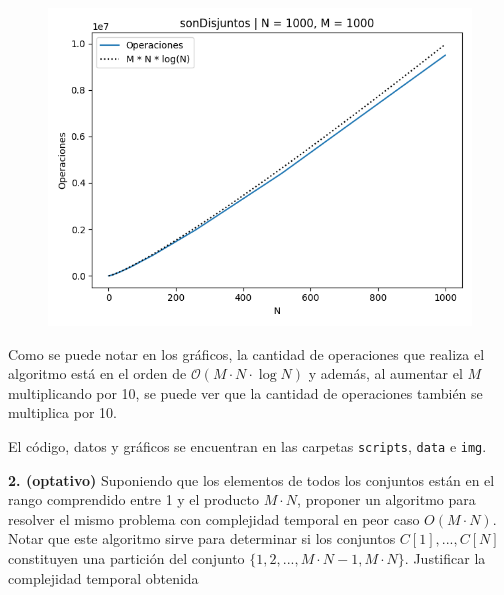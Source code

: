 \documentclass[10pt, a4paper]{article}
\newcommand{\bigO}{\mathcal{O}}
\begin{document}
\begin{figure}[H]
  \endminipage\hfill
    \includegraphics[width=\linewidth]{img/sonDisjuntos_1000_1000}
  \endminipage
\end{figure}

Como se puede notar en los gr\'aficos, la cantidad de operaciones que realiza el algoritmo est\'a en el orden de $\bigO(M \cdot N \cdot \log N)$ y adem\'as, al aumentar el $M$ multiplicando por 10, se puede ver que la cantidad de operaciones tambi\'en se multiplica por 10.

\vspace{0.5em}

El c\'odigo, datos y gr\'aficos se encuentran en las carpetas \texttt{scripts}, \texttt{data} e \texttt{img}.


\vspace{1em}

\textbf{2. (optativo)} Suponiendo que los elementos de todos los conjuntos est\'an en el rango comprendido entre 1 y el producto $M \cdot N$, proponer un algoritmo para resolver el mismo problema con complejidad temporal en peor caso $O(M \cdot N)$. Notar que este algoritmo sirve para determinar si los conjuntos $C[1],...,C[N]$ constituyen una partici\'on del conjunto $\{1, 2,..., M \cdot N - 1, M \cdot N\}$. Justificar la complejidad temporal obtenida

\vspace{0.5em}
\end{document}
